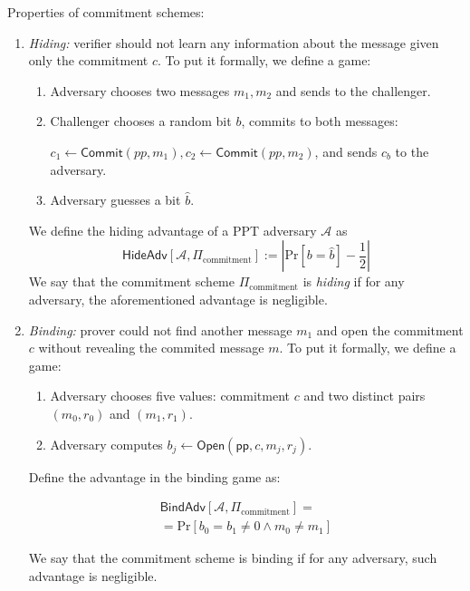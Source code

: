 \documentclass[../lecture-notes.tex]{subfiles}
\begin{document}
\begin{definition}
    Properties of commitment schemes:
    \begin{enumerate}
        \item \textit{Hiding: } verifier should not learn any information about the message given only the commitment $c$. To put it formally, we define a game:
        \begin{enumerate}
            \item Adversary chooses two messages $m_1,m_2$ and sends to the challenger.
            \item Challenger chooses a random bit $b$, commits to both messages: 
            
                $c_1 \gets \mathsf{Commit}(pp, m_1), c_2 \gets \mathsf{Commit}(pp,m_2)$, 
                    and sends $c_b$ to the adversary.
            \item Adversary guesses a bit $\hat{b}$.
        \end{enumerate}
        
        We define the hiding advantage of a PPT adversary $\mathcal{A}$ as 
        \begin{equation*}
            \mathsf{HideAdv}[\mathcal{A}, \Pi_{\text{commitment}}] := \left| \text{Pr}[b=\hat{b}] - \frac{1}{2} \right|
        \end{equation*}
        We say that the commitment scheme $\Pi_{\text{commitment}}$ is \textit{hiding} if for any adversary, the aforementioned advantage is negligible.
        
        \item \textit{Binding: } prover could not find another message $m_1$ and open the commitment $c$ without revealing the commited message $m$.
        To put it formally, we define a game:
        
        \begin{enumerate}
            \item Adversary chooses five values: commitment $c$ and two distinct pairs $(m_0,r_0)$ and $(m_1,r_1)$.
            \item Adversary computes $b_j \gets \mathsf{Open}(\mathsf{pp}, c, m_j, r_j)$. 
        \end{enumerate}
        
        Define the advantage in the binding game as:
        
        \begin{equation*}
            \begin{aligned}
                \mathsf{BindAdv}[\mathcal{A}, \Pi_{\text{commitment}}] = \\ = \text{Pr}[b_0 = b_1 \neq 0 \wedge m_0 \neq m_1]                
            \end{aligned}
        \end{equation*}

        We say that the commitment scheme is binding if for any adversary, such advantage is negligible.

    \end{enumerate}
\end{definition}
\end{document}
